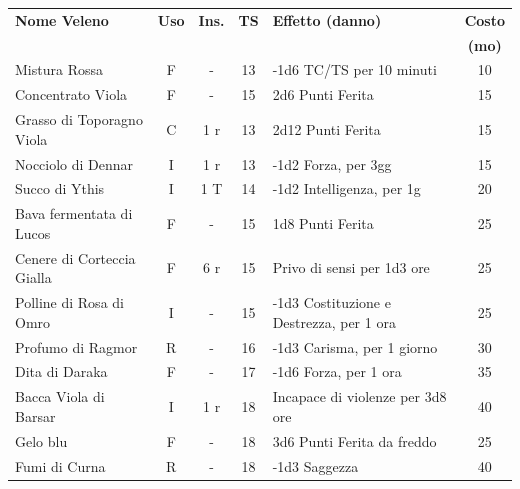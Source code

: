 	\noindent\begin{tabularx}{\linewidth}{lcccXc}
	\toprule
 \rowcolor{gray!20}\textbf{Nome Veleno} & \textbf{Uso} & \textbf{Ins.} & \textbf{TS} & \textbf{Effetto (danno)} & \textbf{Costo}\\
 \rowcolor{gray!20}&&&&&\textbf{(mo)}\\
\toprule
	Mistura Rossa \index{Mistura Rossa} & F& -& 13& -1d6 TC/TS per 10 minuti & 10\\

 \rowcolor{gray!20}Concentrato Viola \index{Concentrato Viola} & F& -& 15& 2d6 Punti Ferita & 15\\

	Grasso di Toporagno Viola \index{Grasso di Toporagno Viola} & C& 1 r& 13& 2d12 Punti Ferita & 15\\

 \rowcolor{gray!20}Nocciolo di Dennar \index{Nocciolo di Dennar}& I& 1 r& 13& -1d2 Forza, per 3gg& 15\\

	Succo di Ythis\index{Succo di Ythis} & I& 1 T& 14& -1d2 Intelligenza, per 1g& 20\\

	Bava fermentata di Lucos \index{Bava fermentata di Lucos}\label{bavadilucos}\hypertarget{bavadilucos}{}& F& - & 15& 1d8 Punti Ferita& 25\\

 \rowcolor{gray!20}Cenere di Corteccia Gialla \index{Cenere di Corteccia Gialla} & F& 6 r& 15& Privo di sensi per 1d3 ore& 25\\

	Polline di Rosa di Omro\index{Polline di Rosa di Omro} & I& - & 15& -1d3 Costituzione e Destrezza, per 1 ora & 25\\

 \rowcolor{gray!20}Profumo di Ragmor \index{Profumo di Ragmor}& R& - & 16& -1d3 Carisma, per 1 giorno & 30\\

	Dita di Daraka\index{Dita di Daraka} & F& - & 17& -1d6 Forza, per 1 ora & 35\\

 \rowcolor{gray!20}Bacca Viola di Barsar\index{Bacca Viola di Barsar}& I& 1 r& 18& Incapace di violenze per 3d8 ore& 40 \\

	Gelo blu \index{Gelo blu} & F& -& 18& 3d6 Punti Ferita da freddo& 25\\

 \rowcolor{gray!20}Fumi di Curna\index{Fumi di Curna} & R& - & 18& -1d3 Saggezza & 40\\


\end{tabularx}

